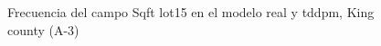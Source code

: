 \begin{figure}[H]
    \centering
    
    \caption{Frecuencia del campo Sqft lot15 en el modelo real y tddpm, King county (A-3)}
    \label{frecuency-tddpm-sqft lot15}
\end{figure}